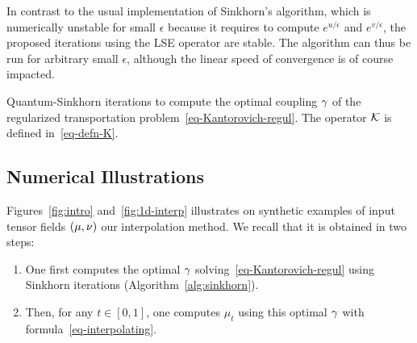 \begin{rem}[Stability]In contrast to the usual implementation of Sinkhorn's algorithm, which is numerically unstable for small $\epsilon$ because it requires to compute $e^{u/\epsilon}$ and $e^{v/\epsilon}$, the proposed iterations using the LSE operator are stable. The algorithm can thus be run for arbitrary small $\epsilon$, although the linear speed of convergence is of course impacted. 
\end{rem}


\begin{algorithm}[t]
\fbox{\hspace{-.1in}\parbox{\columnwidth}{%
\begin{algorithmic}
\Function{Quantum-Sinkhorn}{$\mu,\nu,c,\epsilon,\rho_1,\rho_2$}
	\algspace
	\State $\foralls k=1,2, \quad \tau_k \in ]0,\tfrac{2 \epsilon}{\epsilon+\rho_k}[$, 
	\Let{$\foralls (i,j) \in I \times J, \quad (u_i,v_j)$}{$(0_{d \times d}, 0_{d \times d})$}
	\For{$s=1,2,3,\ldots$}
		\Let{$K$}{$\Kern(u,v)$}
		\State $\foralls i \in I, \quad u_i \RelaxAssign{\tau_1} \LSE_j(K_{i,j})-\log(\mu_i)$
		\Let{$K$}{$\Kern(u,v)$}
		\State $\foralls j \in J, \quad v_j \RelaxAssign{\tau_2} \LSE_i(K_{i,j})-\log(\nu_j)$
	\EndFor
	\State\Return{$(\ga_{i,j} = \exp(K_{i,j}))_{i,j}$}
\EndFunction
  \end{algorithmic}
}}
\caption{Quantum-Sinkhorn iterations to compute the optimal coupling $\gamma$ of the regularized transportation problem~\eqref{eq-Kantorovich-regul}. The operator $\mathcal{K}$ is defined in~\eqref{eq-defn-K}.\label{alg:sinkhorn}}
\end{algorithm}

\begin{rem}
\end{rem}

\subsection{Numerical Illustrations}
\label{sec-numerics-interp}

Figures~\ref{fig:intro} and~\ref{fig:1d-interp} illustrates on synthetic examples of input tensor fields $(\mu,\nu)$ our interpolation method. 
%
We recall that it is obtained in two steps:
\begin{enumerate}
	\item One first computes the optimal $\gamma$ solving~\eqref{eq-Kantorovich-regul} using Sinkhorn iterations (Algorithm~\ref{alg:sinkhorn}).
	\item Then, for any $t \in [0,1]$, one computes $\mu_t$ using this optimal $\gamma$ with formula~\eqref{eq-interpolating}.
\end{enumerate}
   
